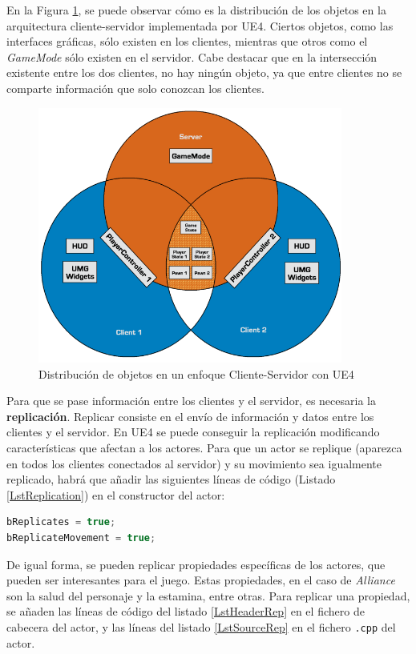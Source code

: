 En la Figura \ref{Objects}, se puede observar cómo es la distribución de los objetos en la arquitectura cliente-servidor implementada por \ac{UE4}. Ciertos objetos, como las interfaces gráficas, sólo existen en los clientes, mientras que otros como el \textit{GameMode} sólo existen en el servidor. Cabe destacar que en la intersección existente entre los dos clientes, no hay ningún objeto, ya que entre clientes no se comparte información que solo conozcan los clientes.

\begin{figure}[H]
  \centering
  \includegraphics[width=10cm]{./images/ActorsInClientServer.png}
  \caption{Distribución de objetos en un enfoque Cliente-Servidor con \ac{UE4}}
  \label{Objects}
\end{figure}

Para que se pase información entre los clientes y el servidor, es necesaria la \textbf{replicación}. Replicar consiste en el envío de información y datos entre los clientes y el servidor. En \ac{UE4} se puede conseguir la replicación modificando características que afectan a los actores. Para que un actor se replique (aparezca en todos los clientes conectados al servidor) y su movimiento sea igualmente replicado, habrá que añadir las siguientes líneas de código (Listado \ref{LstReplication}) en el constructor del actor:

\begin{lstlisting}[language=c++,caption={Replicación de un actor en C++},captionpos=b,label={LstReplication}]
bReplicates = true;
bReplicateMovement = true;
\end{lstlisting}

De igual forma, se pueden replicar propiedades específicas de los actores, que pueden ser interesantes para el juego. Estas propiedades, en el caso de \textit{Alliance} son la salud del personaje y la estamina, entre otras. Para replicar una propiedad, se añaden las líneas de código del listado \ref{LstHeaderRep} en el fichero de cabecera del actor, y las líneas del listado \ref{LstSourceRep} en el fichero \texttt{.cpp} del actor.

